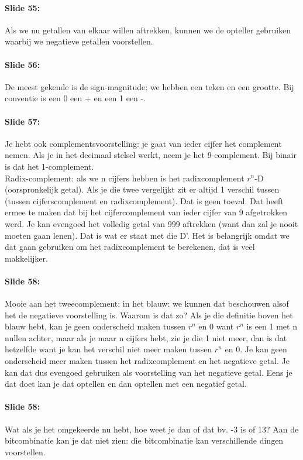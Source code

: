 \documentclass[10pt,a4paper]{book}
\begin{document}
\paragraph{Slide 55:} Als we nu getallen van elkaar willen aftrekken, kunnen we de opteller gebruiken waarbij we negatieve getallen voorstellen. 

\paragraph{Slide 56:} De meest gekende is de sign-magnitude: we hebben een teken en een grootte. Bij conventie is een 0 een + en een 1 een -.

\paragraph{Slide 57:} Je hebt ook complementsvoorstelling: je gaat van ieder cijfer het complement nemen. Als je in het decimaal stelsel werkt, neem je het 9-complement. Bij binair is dat het 1-complement.\\
Radix-complement: als we n cijfers hebben is het radixcomplement $r^n$-D (oorspronkelijk getal). Als je die twee vergelijkt zit er altijd 1 verschil tussen (tussen cijferscomplement en radixcomplement). Dat is geen toeval. Dat heeft ermee te maken dat bij het cijfercomplement van ieder cijfer van 9 afgetrokken werd. Je kan evengoed het volledig getal van 999 aftrekken (want dan zal je nooit moeten gaan lenen). Dat is wat er staat met die D'. Het is belangrijk omdat we dat gaan gebruiken om het radixcomplement te berekenen, dat is veel makkelijker.

\paragraph{Slide 58:} Mooie aan het tweecomplement: in het blauw: we kunnen dat beschouwen alsof het de negatieve voorstelling is. Waarom is dat zo? Als je die definitie boven het blauw hebt, kan je geen onderscheid maken tussen $r^n$ en 0 want $r^n$ is een 1 met n nullen achter, maar als je maar n cijfers hebt, zie je die 1 niet meer, dan is dat hetzelfde want je kan het verschil niet meer maken tussen $r^n$ en 0. Je kan geen onderscheid meer maken tussen het radixcomplement en het negatieve getal. Je kan dat dus evengoed gebruiken als voorstelling van het negatieve getal. Eens je dat doet kan je dat optellen en dan optellen met een negatief getal. 

\paragraph{Slide 58:} Wat als je het omgekeerde nu hebt, hoe weet je dan of dat bv. -3 is of 13? Aan de bitcombinatie kan je dat niet zien: die bitcombinatie kan verschillende dingen voorstellen.
\end{document}
